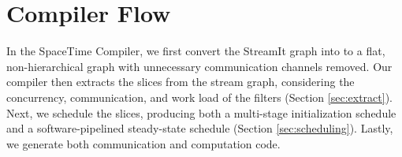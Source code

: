 \section{Compiler Flow} 

In the SpaceTime Compiler, we first convert the StreamIt graph into to
a flat, non-hierarchical graph with unnecessary communication channels
removed.  Our compiler then extracts the slices from the stream
graph, considering the concurrency, communication, and work load of
the filters (Section \ref{sec:extract}).  Next, we schedule the
slices, producing both a multi-stage initialization schedule and a
software-pipelined steady-state schedule (Section
\ref{sec:scheduling}).  Lastly, we generate both communication and
computation code.  
